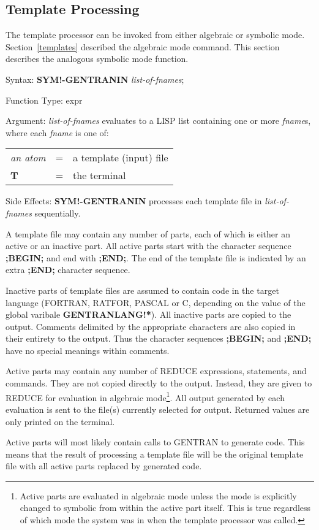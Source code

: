 \subsection{Template Processing}
The template processor can be invoked from either algebraic or
symbolic mode.  Section~\ref{templates} described the algebraic mode
command.  This section describes the analogous symbolic mode function.
\begin{describe}{Syntax:}
{\bf SYM!-GENTRANIN} {\it list-of-fnames\/};
\end{describe}
\begin{describe}{Function Type:}
expr
\end{describe}
\begin{describe}{Argument:}
{\it list-of-fnames\/} evaluates to a LISP list containing one or more
{\it fname\/}s, where each {\it fname\/} is one of:

\begin{tabular}{lll}
{\it an atom} & = & a template (input) file\\
{\bf T} & = & the terminal\\
\end{tabular}
\end{describe}
\begin{describe}{Side Effects:}
{\bf SYM!-GENTRANIN} processes each template file in {\it list-of-fnames\/}
sequentially.

A template file may contain any number of parts, each of which
is either an active or an inactive part.  All active parts start with
the character sequence {\bf ;BEGIN;} and end with {\bf ;END;}.  The end
of the template file is indicated by an extra {\bf ;END;} character sequence.

Inactive parts of template files are assumed to contain code in
the target language (FORTRAN, RATFOR, PASCAL or C, depending on
the value of the global varibale {\bf GENTRANLANG!*}).  All
inactive parts are copied to the output.  Comments delimited
by the appropriate characters are also copied in their entirety
to the output.  Thus the character sequences {\bf ;BEGIN;} and {\bf ;END;}
have no special meanings within comments. 

Active parts may contain any number of REDUCE expressions, statements,
and commands.  They are not copied directly to the output.  Instead,
they are given to REDUCE for evaluation in algebraic mode\footnote{
Active parts are evaluated in algebraic mode unless the mode is
explicitly changed to symbolic from within the active part itself.
This is true regardless of which mode the system was in when the
template processor was called.}.  All output generated by each
evaluation is sent to the file(s) currently selected for output.
Returned values are only printed on the terminal.

Active parts will most likely contain calls to GENTRAN to generate
code.  This means that the result of processing a template file will
be the original template file with all active parts replaced by
generated code.
\end{describe}

